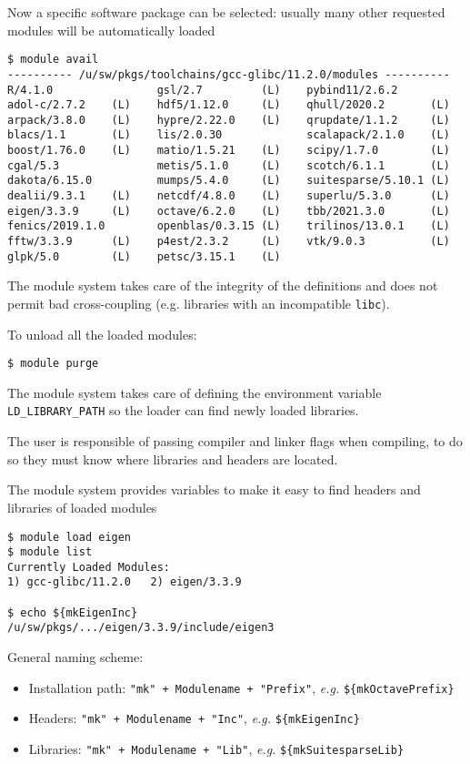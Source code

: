 \documentclass[10pt]{beamer}
\begin{document}
\begin{frame}[fragile]
  \small
  Now a specific software package can be selected: usually many other requested modules will be automatically loaded
\begin{verbatim}
$ module avail
---------- /u/sw/pkgs/toolchains/gcc-glibc/11.2.0/modules ----------
R/4.1.0                gsl/2.7         (L)    pybind11/2.6.2
adol-c/2.7.2    (L)    hdf5/1.12.0     (L)    qhull/2020.2       (L)
arpack/3.8.0    (L)    hypre/2.22.0    (L)    qrupdate/1.1.2     (L)
blacs/1.1       (L)    lis/2.0.30             scalapack/2.1.0    (L)
boost/1.76.0    (L)    matio/1.5.21    (L)    scipy/1.7.0        (L)
cgal/5.3               metis/5.1.0     (L)    scotch/6.1.1       (L)
dakota/6.15.0          mumps/5.4.0     (L)    suitesparse/5.10.1 (L)
dealii/9.3.1    (L)    netcdf/4.8.0    (L)    superlu/5.3.0      (L)
eigen/3.3.9     (L)    octave/6.2.0    (L)    tbb/2021.3.0       (L)
fenics/2019.1.0        openblas/0.3.15 (L)    trilinos/13.0.1    (L)
fftw/3.3.9      (L)    p4est/2.3.2     (L)    vtk/9.0.3          (L)
glpk/5.0        (L)    petsc/3.15.1    (L)
\end{verbatim}

The module system takes care of the integrity of the definitions and does not permit bad cross-coupling (e.g. libraries with an incompatible \texttt{libc}).\smallskip

To unload all the loaded modules:
\begin{verbatim}
$ module purge
\end{verbatim}
\end{frame}


\begin{frame}[fragile]

  The module system takes care of defining the environment variable \texttt{LD\_LIBRARY\_PATH} so the loader can find newly loaded libraries.

  The user is responsible of passing compiler and linker flags when compiling, to do so they must know where libraries and headers are located.

  The module system provides variables to make it easy to find headers and libraries of loaded modules

\begin{verbatim}
$ module load eigen
$ module list
Currently Loaded Modules:
1) gcc-glibc/11.2.0   2) eigen/3.3.9

$ echo ${mkEigenInc}
/u/sw/pkgs/.../eigen/3.3.9/include/eigen3
\end{verbatim}

General naming scheme: 
\begin{itemize}
\item Installation path: \texttt{"mk" + Modulename + "Prefix"}, \textit{e.g.} \texttt{\$\{mkOctavePrefix\}}
\item Headers: \texttt{"mk" + Modulename + "Inc"}, \textit{e.g.} \texttt{\$\{mkEigenInc\}}
\item Libraries: \texttt{"mk" + Modulename + "Lib"}, \textit{e.g.} \texttt{\$\{mkSuitesparseLib\}}
\end{itemize}
\end{frame}
\end{document}
